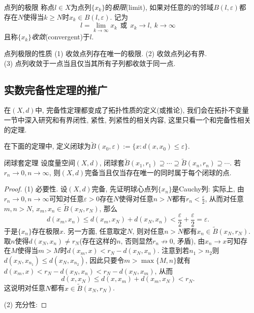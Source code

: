 \begin{definition}{点列的极限}
	称点$l \in X$为点列$\{ x_k \}$的\textit{极限}(limit), 如果对任意的$l$的邻域$B(l,\varepsilon)$都存在$N$使得当$k \geq N$时$x_k \in B(l,\varepsilon)$. 记为$$l = \lim_{k \to \infty} x_k ~~ \text{或} ~~ x_k \to l,~k \to \infty$$且称$\{ x_k \}$\textit{收敛}(convergent)于$l$. 
\end{definition}

\begin{proposition}{点列极限的性质}
	(1) 收敛点列存在唯一的极限. \qquad (2) 收敛点列必有界. \\
	(3) 点列收敛于一点当且仅当其所有子列都收敛于同一点. 
\end{proposition}

\subsection{实数完备性定理的推广}

在$(X,d)$中, 完备性定理都变成了拓扑性质的定义(或推论), 我们会在拓扑不变量一节中深入研究和有界闭性, 紧性, 列紧性的相关内容, 这里只看一个和完备性相关的定理. 

在下面的定理中, 定义闭球为$\tilde{B}(x_0,\varepsilon):=\{ x:d(x,x_0)\leq \varepsilon \}$. 

\begin{theorem}{闭球套定理}
	设度量空间$(X,d)$, 闭球套$\tilde{B}(x_1,r_1) \supseteq \cdots \supseteq \tilde{B}(x_n,r_n) \supseteq \cdots$. 若$r_n \to 0,n\to \infty$, 则$(X,d)$完备当且仅当存在唯一的同时属于每个闭球的点. 
\end{theorem}
\begin{proof}
	(1) 必要性. 设$(X,d)$完备, 先证明球心点列$\{ x_n \}$是Cauchy列: 实际上, 由$r_n \to 0,n\to \infty$可知对任意$\varepsilon >0$存在$N$使得对任意$n >N$都有$r_n<\frac{\varepsilon}{2}$, 从而对任意$m,n>N$, $x_m,x_n \in \tilde{B}(x_N,r_N)$, 那么$$d(x_m,x_n) \leq d(x_m,x_N)+d(x_N,x_n) < \frac{\varepsilon}{2} + \frac{\varepsilon}{2} = \varepsilon .$$
	于是$\{ x_n \}$存在极限$x$. 另一方面, 任意取定$N$, 则对任意$n>N$都有$x_n \in \tilde{B}(x_N,r_N)$. 取$n$使得$d(x_N,x_n) \neq r_N$(存在这样的$n$, 否则显然$r_n \nrightarrow 0$, 矛盾), 由$x_n \to x$可知存在$M$使得当$m>M$时$d(x_m,x)<r_N-d(x_N,x_n)$. 注意到若$n_1>n_2$则$d(x_N,x_{n_1}) \leq d(x_N,x_{n_2})$, 因此只要令$m>\max \{ M,n \}$就有$d(x_m,x)<r_N-d(x_N,x_n)<r_N-d(x_N,x_m)$, 从而$$d(x,x_N) \leq d(x,x_m) + d(x_m,x_N) < r_N. $$
	这说明对任意$N$都有$x \in \tilde{B}(x_N,r_N)$. 
	
	(2) 充分性: 
\end{proof}





